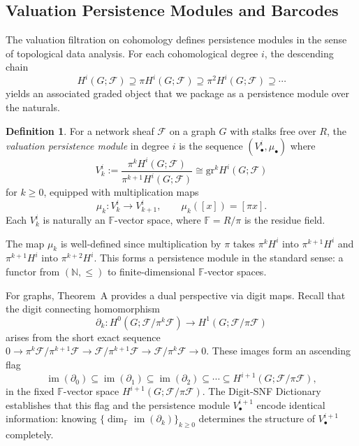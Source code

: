 \documentclass[11pt]{amsart}
\theoremstyle{plain}
\theoremstyle{definition}
\newtheorem{definition}[theorem]{Definition}
\newcommand{\Ring}{R}                          %
\newcommand{\unif}{\pi}                        %
\newcommand{\sheaf}[1]{\mathcal{#1}}                  %
\newcommand{\Digit}[1]{\partial_{#1}}%
\newcommand{\gr}{\mathrm{gr}}                         %
\DeclareMathOperator{\im}{im}                         %
\begin{document}
\subsection{Valuation Persistence Modules and Barcodes}
\label{ssec:valuation-persistence}

The valuation filtration on cohomology defines persistence modules in the sense of topological data analysis. For each cohomological degree $i$, the descending chain
\[
H^i(G;\sheaf{F}) \supseteq \unif H^i(G;\sheaf{F}) \supseteq \unif^2 H^i(G;\sheaf{F}) \supseteq \cdots
\]
yields an associated graded object that we package as a persistence module over the naturals.

\begin{definition}
\label{def:valuation-persistence}
For a network sheaf $\sheaf{F}$ on a graph $G$ with stalks free over $\Ring$, the \emph{valuation persistence module} in degree $i$ is the sequence $(V^i_\bullet, \mu_\bullet)$ where
\[
V^i_k := \frac{\unif^k H^i(G;\sheaf{F})}{\unif^{k+1} H^i(G;\sheaf{F})} \cong \gr^k H^i(G;\sheaf{F})
\]
for $k \ge 0$, equipped with multiplication maps
\[
\mu_k: V^i_k \to V^i_{k+1}, \qquad \mu_k([x]) = [\unif x].
\]
Each $V^i_k$ is naturally an $\mathbb{F}$-vector space, where $\mathbb{F} = \Ring/\unif$ is the residue field.
\end{definition}

The map $\mu_k$ is well-defined since multiplication by $\unif$ takes $\unif^k H^i$ into $\unif^{k+1} H^i$ and $\unif^{k+1} H^i$ into $\unif^{k+2} H^i$. This forms a persistence module in the standard sense: a functor from $(\mathbb{N}, \le)$ to finite-dimensional $\mathbb{F}$-vector spaces.

For graphs, Theorem~A provides a dual perspective via digit maps. Recall that the digit connecting homomorphism
\[
\Digit{k}: H^0(G;\sheaf{F}/\unif^k\sheaf{F}) \longrightarrow H^1(G;\sheaf{F}/\unif\sheaf{F})
\]
arises from the short exact sequence $0 \to \unif^k\sheaf{F}/\unif^{k+1}\sheaf{F} \to \sheaf{F}/\unif^{k+1}\sheaf{F} \to \sheaf{F}/\unif^k\sheaf{F} \to 0$. These images form an ascending flag
\[
\im(\Digit{0}) \subseteq \im(\Digit{1}) \subseteq \im(\Digit{2}) \subseteq \cdots \subseteq H^{i+1}(G;\sheaf{F}/\unif\sheaf{F}),
\]
in the fixed $\mathbb{F}$-vector space $H^{i+1}(G;\sheaf{F}/\unif\sheaf{F})$. The Digit-SNF Dictionary establishes that this flag and the persistence module $V^{i+1}_\bullet$ encode identical information: knowing $\{\dim_{\mathbb{F}} \im(\Digit{k})\}_{k \ge 0}$ determines the structure of $V^{i+1}_\bullet$ completely.
\end{document}
